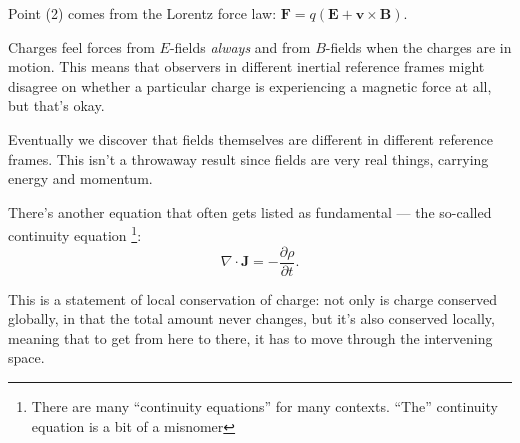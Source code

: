 \documentclass{article}
\begin{document}
\vspace{1em}

Point (2) comes from the Lorentz force law: $\bm{F} = q \left( \bm{E} + \bm{v} \times \bm{B} \right)$.

\vspace{1em}

Charges feel forces from $E$-fields \emph{always} and from $B$-fields when the charges are in motion. This means that observers in different inertial reference frames might disagree on whether a particular charge is experiencing a magnetic force at all, but that's okay.

\vspace{1em}

Eventually we discover that fields themselves are different in different reference frames. This isn't a throwaway result since fields are very real things, carrying energy and momentum.

\vspace{1em}

There's another equation that often gets listed as fundamental --- the so-called continuity equation \footnote{There are many ``continuity equations'' for many contexts. ``The'' continuity equation is a bit of a misnomer}:
\begin{equation*}
    \nabla \cdot \bm{J} = -\frac{\partial \rho}{\partial t}.
\end{equation*}

This is a statement of local conservation of charge: not only is charge conserved globally, in that the total amount never changes, but it's also conserved locally, meaning that to get from here to there, it has to move through the intervening space.
\end{document}
